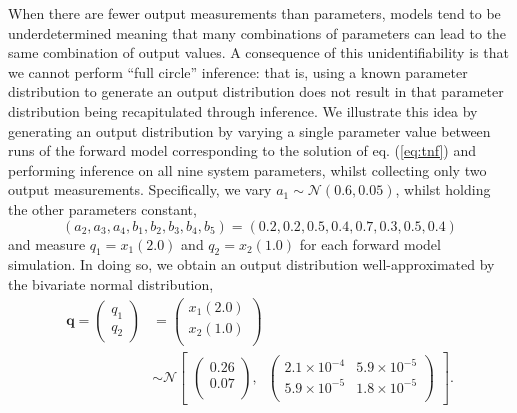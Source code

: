 %
When there are fewer output measurements than parameters, models tend to be underdetermined meaning that many combinations of parameters can lead to the same combination of output values. A consequence of this unidentifiability is that we cannot perform ``full circle'' inference: that is, using a known parameter distribution to generate an output distribution does not result in that parameter distribution being recapitulated through inference. We illustrate this idea by generating an output distribution by varying a single parameter value between runs of the forward model corresponding to the solution of eq. (\ref{eq:tnf}) and performing inference on all nine system parameters, whilst collecting only two output measurements. Specifically, we vary $a_1\sim \mathcal{N}(0.6, 0.05)$, whilst holding the other parameters constant, $$(a_2,a_3,a_4,b_1,b_2,b_3,b_4,b_5)=(0.2, 0.2, 0.5, 0.4, 0.7, 0.3, 0.5, 0.4)$$ and measure $q_1=x_1(2.0)$ and $q_2=x_2(1.0)$ for each forward model simulation. In doing so, we obtain an output distribution well-approximated by the bivariate normal distribution,
%
\begin{equation}\label{eq:tnf_circular_target}
\begin{aligned}
\boldsymbol{q} = \begin{pmatrix} q_1 \\ q_2 \end{pmatrix}
&=
\begin{pmatrix}
x_1(2.0)\\
x_2(1.0)\\
\end{pmatrix} \\
&\sim  \mathcal{N}
\begin{bmatrix}
\begin{pmatrix}
0.26\\
0.07\\
\end{pmatrix}, \;\;
\begin{pmatrix}
2.1\times 10^{-4} & 5.9\times 10^{-5}\\
5.9\times 10^{-5} & 1.8\times 10^{-5}\\
\end{pmatrix}
\end{bmatrix}.
\end{aligned}
\end{equation}
%
